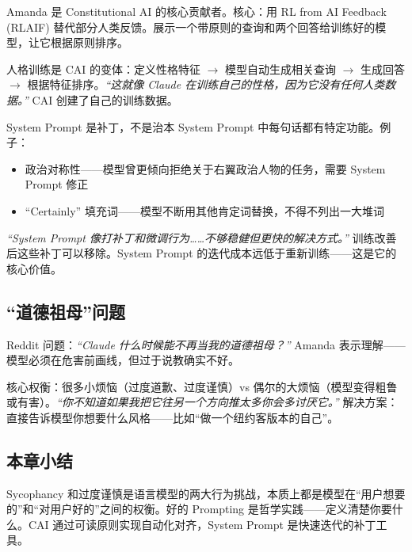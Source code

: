 Amanda 是 Constitutional AI 的核心贡献者。核心：用 RL from AI Feedback (RLAIF) 替代部分人类反馈。展示一个带原则的查询和两个回答给训练好的模型，让它根据原则排序。

人格训练是 CAI 的变体：定义性格特征 $\to$ 模型自动生成相关查询 $\to$ 生成回答 $\to$ 根据特征排序。\textit{``这就像 Claude 在训练自己的性格，因为它没有任何人类数据。''} CAI 创建了自己的训练数据。

\begin{warningbox}{System Prompt 是补丁，不是治本}
System Prompt 中每句话都有特定功能。例子：
\begin{itemize}
    \item 政治对称性——模型曾更倾向拒绝关于右翼政治人物的任务，需要 System Prompt 修正
    \item ``Certainly'' 填充词——模型不断用其他肯定词替换，不得不列出一大堆词
\end{itemize}

\textit{``System Prompt 像打补丁和微调行为……不够稳健但更快的解决方式。''} 训练改善后这些补丁可以移除。System Prompt 的迭代成本远低于重新训练——这是它的核心价值。
\end{warningbox}

\subsection{``道德祖母''问题}

Reddit 问题：\textit{``Claude 什么时候能不再当我的道德祖母？''} Amanda 表示理解——模型必须在危害前画线，但过于说教确实不好。

核心权衡：很多小烦恼（过度道歉、过度谨慎）vs 偶尔的大烦恼（模型变得粗鲁或有害）。\textit{``你不知道如果我把它往另一个方向推太多你会多讨厌它。''} 解决方案：直接告诉模型你想要什么风格——比如``做一个纽约客版本的自己''。

\subsection{本章小结}

Sycophancy 和过度谨慎是语言模型的两大行为挑战，本质上都是模型在``用户想要的''和``对用户好的''之间的权衡。好的 Prompting 是哲学实践——定义清楚你要什么。CAI 通过可读原则实现自动化对齐，System Prompt 是快速迭代的补丁工具。

